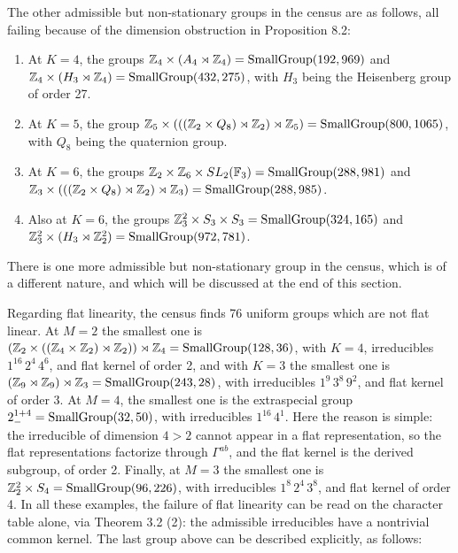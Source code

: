 \documentclass[12pt]{amsart}
\theoremstyle{definition}
\begin{document}
The other admissible but non-stationary groups in the census are as follows, all failing because of the dimension obstruction in Proposition 8.2:
\begin{enumerate}
\item At $K=4$, the groups $\mathbb Z_4\times(A_4\rtimes\mathbb Z_4)={\rm SmallGroup}(192,969)$ and $\mathbb Z_4\times(H_3\rtimes\mathbb Z_4)={\rm SmallGroup}(432,275)$, with $H_3$ being the Heisenberg group of order 27.

\item At $K=5$, the group $\mathbb Z_5\times(((\mathbb Z_2\times Q_8)\rtimes\mathbb Z_2)\rtimes\mathbb Z_5)={\rm SmallGroup}(800,1065)$, with $Q_8$ being the quaternion group.

\item At $K=6$, the groups $\mathbb Z_2\times\mathbb Z_6\times SL_2(\mathbb F_3)={\rm SmallGroup}(288,981)$ and $\mathbb Z_3\times(((\mathbb Z_2\times Q_8)\rtimes\mathbb Z_2)\rtimes\mathbb Z_3)={\rm SmallGroup}(288,985)$.

\item Also at $K=6$, the groups $\mathbb Z_3^2\times S_3\times S_3={\rm SmallGroup}(324,165)$ and $\mathbb Z_3^2\times(H_3\rtimes\mathbb Z_2^2)={\rm SmallGroup}(972,781)$.
\end{enumerate}

There is one more admissible but non-stationary group in the census, which is of a different nature, and which will be discussed at the end of this section.

Regarding flat linearity, the census finds 76 uniform groups which are not flat linear. At $M=2$ the smallest one is $(\mathbb Z_2\times((\mathbb Z_4\times\mathbb Z_2)\rtimes\mathbb Z_2))\rtimes\mathbb Z_4={\rm SmallGroup}(128,36)$, with $K=4$, irreducibles $1^{16}\,2^4\,4^6$, and flat kernel of order 2, and with $K=3$ the smallest one is $(\mathbb Z_9\rtimes\mathbb Z_9)\rtimes\mathbb Z_3={\rm SmallGroup}(243,28)$, with irreducibles $1^9\,3^8\,9^2$, and flat kernel of order 3. At $M=4$, the smallest one is the extraspecial group $2^{1+4}_-={\rm SmallGroup}(32,50)$, with irreducibles $1^{16}\,4^1$. Here the reason is simple: the irreducible of dimension $4>2$ cannot appear in a flat representation, so the flat representations factorize through $\Gamma^{ab}$, and the flat kernel is the derived subgroup, of order 2. Finally, at $M=3$ the smallest one is $\mathbb Z_2^2\times S_4={\rm SmallGroup}(96,226)$, with irreducibles $1^8\,2^4\,3^8$, and flat kernel of order 4. In all these examples, the failure of flat linearity can be read on the character table alone, via Theorem 3.2 (2): the admissible irreducibles have a nontrivial common kernel. The last group above can be described explicitly, as follows:
\end{document}
